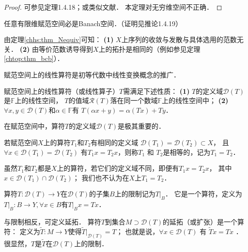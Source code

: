 \begin{proof}
	可参见\parencite{zhang-lin-2021}定理1.4.18；或类似文献．
	本定理对无穷维空间不正确．
\end{proof}

\begin{proposition}\label{chhs:thm_FSB}
	任意有限维赋范空间必是Banach空间．（证明见\parencite{zhang-lin-2021}推论1.4.19）
\end{proposition}

由定理\ref{chhs:thm_Nequiv}可知：
{\bfseries (1)} $X$上序列的收敛与发散与具体选用的范数无关．
{\bfseries (2)} 由等价范数诱导得到$X$上的拓扑是相同的（例如参见定理\ref{chtop:thm_bcb}）．


   
 



赋范空间上的线性算符是初等代数中线性变换概念的推广．

\begin{definition}
赋范空间上的{\heiti 线性算符}（或{\heiti 线性算子}）$T$需满足下述性质：
{\bfseries (1)} $T$的定义域$\mathscr{D}(T)$是$\mathbb{F}$上的线性空间，
$T$的值域$\mathscr{R}(T)$落在同一个数域$\mathbb{F}$上的线性空间中；
{\bfseries (2)} $\forall x, y \in \mathscr{D}(T)$和$\alpha\in \mathbb{F}$有
$T(\alpha x+y) = \alpha (T x)+T y $．
\end{definition}

\begin{remark}
	在赋范空间中，算符$T$的定义域$\mathscr{D}(T)$是极其重要的．
\end{remark}

若赋范空间$X$上的算符$T_{1}$和$T_{2}$有相同的定义域
$\mathscr{D}\left(T_{1}\right)=\mathscr{D}\left(T_{2}\right)\subset X$，
且$\forall x \in \mathscr{D}\left(T_{1}\right)=\mathscr{D}\left(T_{2}\right)$
有$T_{1} x=T_{2} x$，则称$T_{1}$ 和 $T_{2}$是{\heiti 相等的}，记为$T_{1}=T_{2}$．

虽然$T_{1}$和$T_{2}$都是$X$上的算符，若它们的定义域不同，即便有$T_{1} x=T_{2} x$，
其中$x \in \mathscr{D}\left(T_{1}\right)\cap \mathscr{D}\left(T_{2}\right)$；
我们也不认为在$X$上$T_{1}=T_{2}$．

算符$T:\mathscr{D}(T) \longrightarrow Y$在$\mathscr{D}(T)$的子集$B$上的{\heiti 限制}记为$T|_{B}$．
它是一个算符，定义为$T |_{B}: B \longrightarrow Y, \forall x \in B$有$T|_{B} x=T x$．

与限制相反，可定义延拓．
算符$T$到集合$M \supset \mathscr{D}(T)$的{\heiti 延拓}（或{\heiti 扩张}）是一个算符：
定义为$\tilde{T}: M \longrightarrow Y$使得$\tilde{T}|_{\mathscr{D}(T)}=T$；
也就是说，$\forall x \in \mathscr{D}(T)$ 有 $\tilde{T} x=T x$ ．
很显然，$T$是$\tilde{T}$在$\mathscr{D}(T)$上的限制．


